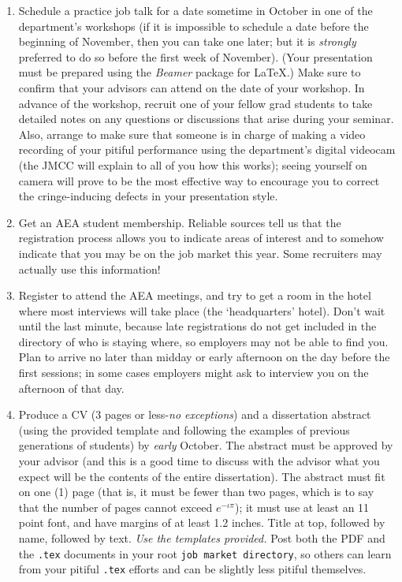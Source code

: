 \documentclass{econtex}
\begin{document}
\begin{enumerate}
\item Schedule a practice job talk for a date sometime in October in
  one of the department's workshops (if it is impossible to schedule a
  date before the beginning of November, then you can take one later;
  but it is {\it strongly} preferred to do so before the first week of
  November).  (Your presentation must be prepared using the {\it
    Beamer} package for {\LaTeX}.)  Make sure to confirm that your
  advisors can attend on the date of your workshop.  In advance of the
  workshop, recruit one of your fellow grad students to take detailed
  notes on any questions or discussions that arise during your
  seminar.  Also, arrange to make sure that someone is in charge of
  making a video recording of your pitiful performance using the
  department's digital videocam (the JMCC will explain to all of you how this works); seeing yourself on camera will prove
  to be the most effective way to encourage you to correct the cringe-inducing defects in
  your presentation style.
  
\item Get an AEA student membership.  Reliable sources tell us that
  the registration process allows you to indicate areas of interest
  and to somehow indicate that you may be on the job market this year.
  Some recruiters may actually use this information!
  
\item Register to attend the AEA meetings, and try to get a room in
  the hotel where most interviews will take place (the `headquarters'
  hotel).  Don't wait until the last minute, because late
  registrations do not get included in the directory of who is staying
  where, so employers may not be able to find you.  Plan to arrive no
  later than midday or early afternoon on the day before the first
  sessions; in some cases employers might ask to interview you on the
  afternoon of that day.
  
\item Produce a CV (3 pages or less-{\it no exceptions}) and a
  dissertation abstract (using the provided template and following the
  examples of previous generations of students) by {\it early} October.  The
  abstract must be approved by your advisor (and this is a good time
  to discuss with the advisor what you expect will be the contents of
  the entire dissertation).  The abstract must fit on one (1) page
  (that is, it must be fewer than two pages, which is to say that the
  number of pages cannot exceed $e^{-\iota \pi}$); it must use at
  least an 11 point font, and have margins of at least 1.2 inches.  Title at
  top, followed by name, followed by text. {\it Use the templates
    provided.}  Post both the PDF and the \texttt{.tex} documents in
  your root \texttt{job market directory}, so others can learn from your pitiful
  \texttt{.tex} efforts and can be slightly less pitiful themselves.


\end{enumerate}
\end{document}

